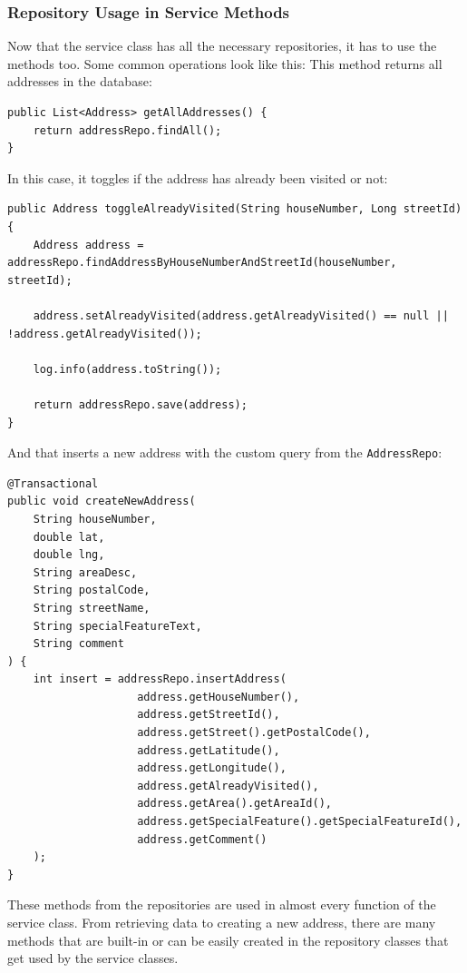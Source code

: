     \subsubsection{Repository Usage in Service Methods}
    Now that the service class has all the necessary repositories, it has to use the methods too. Some common operations look like this: \newline
    This method returns all addresses in the database: 
    \lstset{style=mycsharp, caption=Fetching all Addresses}
    \begin{lstlisting}
public List<Address> getAllAddresses() {
    return addressRepo.findAll();
}
    \end{lstlisting}

    In this case, it toggles if the address has already been visited or not:
    \lstset{style=mycsharp, caption=Toggle Already Visited}
    \begin{lstlisting}
public Address toggleAlreadyVisited(String houseNumber, Long streetId) {
    Address address = addressRepo.findAddressByHouseNumberAndStreetId(houseNumber, streetId);
    
    address.setAlreadyVisited(address.getAlreadyVisited() == null || !address.getAlreadyVisited());
    
    log.info(address.toString());
    
    return addressRepo.save(address);
}
    \end{lstlisting}

    And that inserts a new address with the custom query from the \texttt{AddressRepo}: 
    \lstset{style=mycsharp, caption=Insert new Address}
    \begin{lstlisting}
@Transactional
public void createNewAddress(
    String houseNumber,
    double lat,
    double lng,
    String areaDesc,
    String postalCode,
    String streetName,
    String specialFeatureText,
    String comment
) {
    int insert = addressRepo.insertAddress(
                    address.getHouseNumber(),
                    address.getStreetId(),
                    address.getStreet().getPostalCode(),
                    address.getLatitude(),
                    address.getLongitude(),
                    address.getAlreadyVisited(),
                    address.getArea().getAreaId(),
                    address.getSpecialFeature().getSpecialFeatureId(),
                    address.getComment()
    );
}    
    \end{lstlisting}

    These methods from the repositories are used in almost every function of the service class. From retrieving data to creating a new address, there are many methods that are built-in or can be easily created in the repository classes that get used by the service classes.


